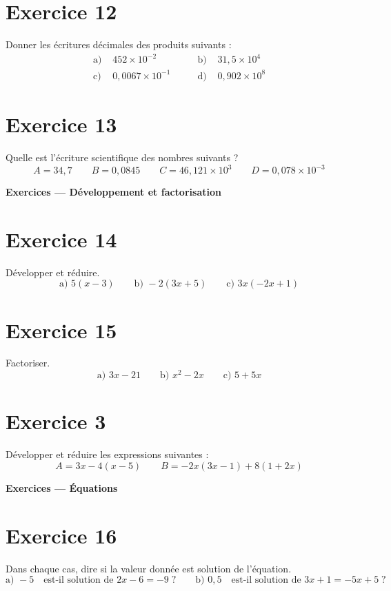 \documentclass[a4paper,11pt]{article}
\begin{document}
\section*{Exercice 12}
Donner les écritures décimales des produits suivants :
\[
\begin{aligned}
\text{a) }& 452\times 10^{-2}
&\qquad \text{b) }& 31{,}5\times 10^{4}\\[4pt]
\text{c) }& 0{,}0067\times 10^{-1}
&\qquad \text{d) }& 0{,}902\times 10^{8}
\end{aligned}
\]

\section*{Exercice 13}
Quelle est l’écriture scientifique des nombres suivants ?
\[
A=34{,}7 
\qquad B=0{,}0845
\qquad C=46{,}121\times 10^{3}
\qquad D=0{,}078\times 10^{-3}
\]

\bigskip
{\Large \textbf{Exercices — Développement et factorisation}}\par\medskip

\section*{Exercice 14}
Développer et réduire.
\[
\text{a) } 5(x-3)
\qquad \text{b) } -2(3x+5)
\qquad \text{c) } 3x(-2x+1)
\]

\section*{Exercice 15}
Factoriser.
\[
\text{a) } 3x-21
\qquad \text{b) } x^{2}-2x
\qquad \text{c) } 5+5x
\]

\section*{Exercice 3}
Développer et réduire les expressions suivantes :
\[
A=3x-4(x-5)
\qquad
B=-2x(3x-1)+8(1+2x)
\]

\bigskip
{\Large \textbf{Exercices — Équations}}\par\medskip

\section*{Exercice 16}
Dans chaque cas, dire si la valeur donnée est solution de l’équation.
\[
\text{a) } -5 \quad \text{est-il solution de } 2x-6=-9\;?
\qquad
\text{b) } 0{,}5 \quad \text{est-il solution de } 3x+1=-5x+5\;?
\]
\end{document}
